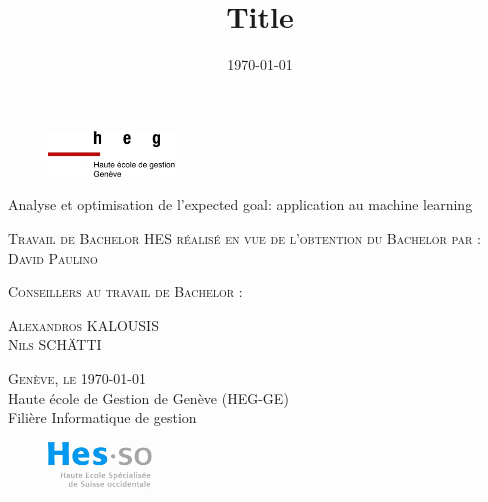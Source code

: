 \documentclass[12pt]{article}
\title{Title}
\author{\DP}
\date{\today}
\newcommand{\DP}{David Paulino}
\newcommand{\place}{Genève}
\newcommand{\fulltitle}{Analyse et optimisation de l'expected goal: application au machine learning}
\begin{document}
\begin{titlepage}

    \begin{figure}[h]
        \includegraphics[width=0.3\textwidth]{img/logo_heg-ge.jpg}
    \end{figure}

    \vspace*{0.5cm}

    \begin{center}

        \begingroup \linespread{1,75} \selectfont
        {\Large \fulltitle}\\[0,75cm]
        \endgroup



        \vspace{1.5cm}

        \textsc{\large Travail de Bachelor HES réalisé en vue de \newline l’obtention du Bachelor par :}\\[0,50cm]

        \begingroup \linespread{1,75} \selectfont
        \textsc{\large \DP}\\[0,50cm]
        \endgroup


        \vspace{1cm}


        \textsc{\large Conseillers au travail de Bachelor : }

        \begingroup \linespread{1,75} \selectfont
        \textsc{\large Alexandros KALOUSIS}\\[0.1cm]
        \textsc{\large Nils SCHÄTTI}\\[1cm]
        \endgroup


        \begingroup \linespread{1,75} \selectfont
        \textsc{\large \place, le \today}\\[0,25cm]

        {\large Haute école de Gestion de Genève (HEG-GE)}\\[0,25cm]

        {\large Filière Informatique de gestion}\\[0,25cm]
        \endgroup



        \begin{figure}[h]
            \vspace*{1cm}
            \hspace*{12cm}\includegraphics[width=0.25\textwidth]{img/logo_hes-so.jpg}
        \end{figure}

    \end{center}



    \vfill
\end{titlepage}
\end{document}
